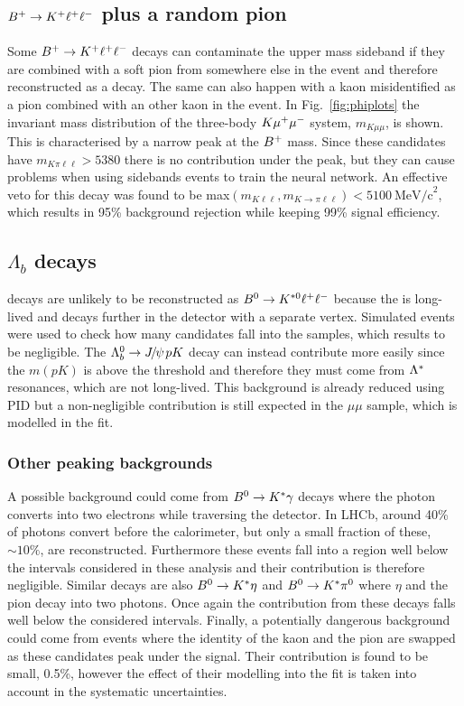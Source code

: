 \subsection{${{B}^+} \rightarrow K^+ \ell^+ \ell^-$ plus a random pion}

Some ${{B}^+} \rightarrow K^+ \ell^+\ell^-$ decays can contaminate the upper \Bz mass sideband if they are combined
with a soft pion from somewhere else in the event and therefore reconstructed as a \Bz decay.
The same can also happen with a kaon misidentified as a pion combined with an other kaon in the event.
In Fig.~\ref{fig:phiplots} the invariant mass distribution of the three-body $K{\mu^+\mu^-}$ system, $m_{K\mu\mu}$, is shown.
This is characterised by a narrow peak at the ${{B}^+}$ mass. Since these
candidates have $m_{K\pi\ell\ell} > 5380$ \mevcc  there is no contribution under the \Bz peak,
but they can cause problems when using sidebands events to train the neural network.
An effective veto for this decay was found to be max$(m_{K\ell\ell},m_{K\to\pi\ell\ell}) < 5100 ~\mbox{MeV/c}^2$,
which results in 95\% background rejection while keeping 99\% signal efficiency.

\subsection{$\Lambda_b$ decays}

\Lb\to\Lz\jpsi decays are unlikely to be reconstructed as ${{B}^0} \rightarrow {\ensuremath{{K}^{*0}}} \ell^+ \ell^-$ because
the \Lz is long-lived and decays further in the detector with a separate vertex.
Simulated events were used to check how many candidates fall into the \Bz samples, which results to be negligible. 
The $\Lb\to\jpsi pK$ decay can instead contribute more easily since the $m(pK)$ is above the \Lz threshold
and therefore they must come from ${\Lambda}^*$ resonances, which are not long-lived. This background is already
reduced using PID but a non-negligible contribution is still expected in the $\mu\mu$ sample, which is modelled in the fit.

\subsubsection{Other peaking backgrounds}

A possible background could come from ${{B}^0} \rightarrow{\ensuremath{{K}^*}}\gamma$ decays where the photon converts
into two electrons while traversing the detector. In LHCb, around 40\% of photons convert before the calorimeter,
but only a small fraction of these, $\sim 10\%$, are reconstructed. Furthermore these events fall
into a \qsq region well below the intervals considered in these analysis and their contribution is therefore negligible.
Similar decays are also $\Bz \to\Kstar\eta$ and $\Bz \to\Kstar\pi^0$ where $\eta$ and the pion decay into
two photons. Once again the contribution from these decays falls well below the considered \qsq intervals.
Finally, a potentially dangerous background could come from events where the
identity of the kaon and the pion are swapped as these candidates peak under the signal.
Their contribution is found to be small, 0.5\%, however the effect of their modelling into the fit
is taken into account in the systematic uncertainties.

